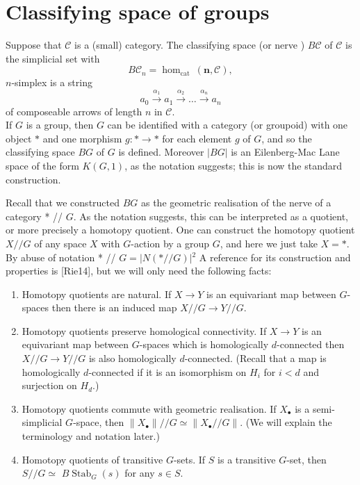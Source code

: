 \section{Classifying space of groups}

Suppose that $\mathcal{C}$ is a (small) category. The classifying space (or nerve ) $B \mathcal{C}$ of $\mathcal{C}$ is the simplicial set with
$$
B \mathcal{C}_n=\operatorname{hom}_{\text {cat }}(\mathbf{n}, \mathcal{C}),
$$
$n$-simplex is a string
$$
a_0 \xrightarrow{\alpha_1} a_1 \xrightarrow{\alpha_2} \ldots \xrightarrow{\alpha_n} a_n
$$
of composeable arrows of length $n$ in $\mathcal{C}$.\\

If $G$ is a group, then $G$ can be identified with a category (or groupoid) with one object $*$ and one morphism $g: * \rightarrow *$ for each element $g$ of $G$, and so the classifying space $B G$ of $G$ is defined. Moreover $|B G|$ is an Eilenberg-Mac Lane space of the form $K(G, 1)$, as the notation suggests; this is now the standard construction.


Recall that we constructed $B G$ as the geometric realisation of the nerve of a category * // $G$. As the notation suggests, this can be interpreted as a quotient, or more precisely a homotopy quotient. One can construct the homotopy quotient $X / / G$ of any space $X$ with $G$-action by a group $G$, and here we just take $X=*$. By abuse of notation * // $G=|N(* / / G)|{ }^2$ A reference for its construction and properties is [Rie14], but we will only need the following facts:

\begin{enumerate}
    \item Homotopy quotients are natural. If $X \rightarrow Y$ is an equivariant map between $G$-spaces then there is an induced map $X / / G \rightarrow Y / / G$.
    \item Homotopy quotients preserve homological connectivity. If $X \rightarrow Y$ is an equivariant map between $G$-spaces which is homologically $d$-connected then $X / / G \rightarrow Y / / G$ is also homologically $d$-connected. (Recall that a map is homologically $d$-connected if it is an isomorphism on $H_i$ for $i<d$ and surjection on $H_d$.)
    \item Homotopy quotients commute with geometric realisation. If $X_{\bullet}$ is a semi-simplicial $G$-space, then $\left\|X_{\bullet}\right\| / / G \simeq\left\|X_{\bullet} / / G\right\|$. (We will explain the terminology and notation later.)
    \item Homotopy quotients of transitive $G$-sets. If $S$ is a transitive $G$-set, then $S / / G \simeq$ $B \operatorname{Stab}_G(s)$ for any $s \in S$.
\end{enumerate}



